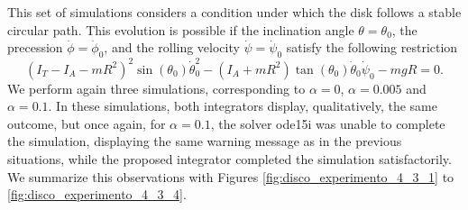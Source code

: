 \documentclass{aims}
\numberwithin{equation}{section}
\theoremstyle{definition}
\begin{document}
\vskip 2mm
 This set of simulations considers a condition under which the disk follows a stable circular path. This evolution is possible if the inclination angle $\theta = \theta_0$, the precession $\dot{\phi} = \dot{\phi}_0$, and the rolling velocity $\dot{\psi} = \dot{\psi}_0$ satisfy the following restriction
\[(I_T-I_A-mR^2)^2\sin(\theta_0)\dot{\theta}_0^2 - (I_A+mR^2)\tan(\theta_0)\dot{\theta}_0\dot{\psi}_0 - mgR = 0.\]
We perform again three simulations, corresponding to $\alpha = 0$, $\alpha =0.005$ and $\alpha = 0.1$. In these simulations, both integrators display, qualitatively,  the same outcome, but once again, for $\alpha = 0.1$, the solver ode15i was unable to complete the simulation, displaying the same warning message as in the previous situations, while the proposed integrator completed the simulation satisfactorily. We summarize this observations with Figures \ref{fig:disco_experimento_4_3_1} to \ref{fig:disco_experimento_4_3_4}.
\end{document}
